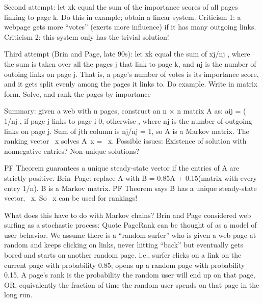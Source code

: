 \documentclass[aspectratio=169]{beamer}
\begin{document}
\begin{frame}{}
	Second attempt: let xk equal the sum of the importance
	scores of all pages linking to page k.
	Do this in example; obtain a linear system.
	Criticism 1: a webpage gets more “votes” (exerts more
	influence) if it has many outgoing links.
	Criticism 2: this system only has the trivial solution!	
\end{frame}


\begin{frame}{}
	Third attempt (Brin and Page, late 90s): let xk equal the sum
	of xj/nj
	, where
	the sum is taken over all the pages j that link to page k, and
	nj
	is the number of outoing links on page j.
	That is, a page’s number of votes is its importance score, and
	it gets split evenly among the pages it links to.
	Do example.
	Write in matrix form.
	Solve, and rank the pages by importance	
\end{frame}

\begin{frame}{}
	Summary: given a web with n pages, construct an n × n
	matrix A as:
	aij =
	(
	1/nj
	, if page j links to page i
	0, otherwise
	,
	where nj
	is the number of outgoing links on page j.
	Sum of jth column is nj/nj = 1, so A is a Markov matrix.
	The ranking vector ~x solves A~x = ~x.
	Possible issues:
	Existence of solution with nonnegative entries?
	Non-unique solutions?	
\end{frame}


\begin{frame}{}
	PF Theorem guarantees a unique steady-state vector if the
entries of A are strictly positive.
Brin–Page: replace A with
B = 0.85A + 0.15(matrix with every entry 1/n).
B is a Markov matrix.
PF Theorem says B has a unique steady-state vector, ~x.
So ~x can be used for rankings!
\end{frame}

\begin{frame}{}
	What does this have to do with Markov chains?
Brin and Page considered web surfing as a stochastic process:
Quote
PageRank can be thought of as a model of user behavior. We
assume there is a “random surfer” who is given a web page at
random and keeps clicking on links, never hitting “back” but
eventually gets bored and starts on another random page.
i.e., surfer clicks on a link on the current page with probability
0.85; opens up a random page with probability 0.15.
A page’s rank is the probability the random user will end up
on that page, OR, equivalently
the fraction of time the random user spends on that page in
the long run.
\end{frame}


\begin{frame}{}
	
\end{frame}
\end{document}
